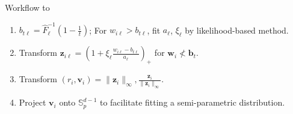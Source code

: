 %     
\begin{algorithm}[ht]
    \caption{Workflow to }\label{alg:workflow}
    \begin{enumerate}
        \item $b_{t\ell} = \hat{F}_{\ell}^{-1}\left(1 - \frac{1}{t}\right)$; 
            For $w_{i\ell} > b_{t\ell}$, fit $a_{\ell}$, $\xi_{\ell}$ 
            by likelihood-based method.
        \item Transform 
            $\bm{z}_{i\ell} = \left(1 + \xi_{\ell}\frac{w_{i\ell} 
                - b_{t\ell}}{a_{\ell}}\right)_+$ for $\bm{w}_i\not< \bm{b}_t$.
        \item Transform $(r_i,\bm{v}_i) = \lVert \bm{z}_i\rVert_\infty, 
            \frac{\bm{z}_i}{\lVert \bm{z}_i\rVert_{\infty}}$.
        \item Project $\bm{v}_i$ onto $\mathbb{S}_{p}^{d-1}$ to facilitate 
            fitting a semi-parametric distribution.
    \end{enumerate}
\end{algorithm}

